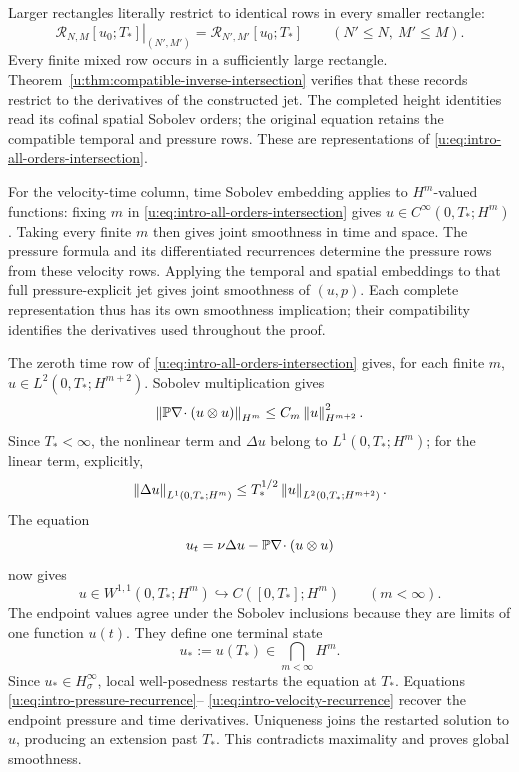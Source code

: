 Larger rectangles literally restrict to identical rows in every smaller
rectangle:
\begin{equation}
 \left.\mathcal R_{N,M}[u_0;T_*]\right|_{(N',M')}
 =\mathcal R_{N',M'}[u_0;T_*]
 \qquad(N'\le N,\ M'\le M).
 \label{u:eq:intro-compatible-intersection}
\end{equation}
Every finite mixed row occurs in a sufficiently large rectangle.
Theorem~\ref{u:thm:compatible-inverse-intersection} verifies that these
records restrict to the derivatives of the constructed jet. The completed
height identities read its cofinal spatial Sobolev orders; the original
equation retains the compatible temporal and pressure rows. These are
representations of \eqref{u:eq:intro-all-orders-intersection}.

For the velocity-time column, time Sobolev embedding applies to
\(H^m\)-valued functions: fixing \(m\) in
\eqref{u:eq:intro-all-orders-intersection} gives
\(u\in C^\infty(0,T_*;H^m)\).  Taking every finite \(m\) then gives
joint smoothness in time and space.  The pressure formula and its
differentiated recurrences determine the pressure rows from these velocity
rows.  Applying the temporal and spatial embeddings to that full
pressure-explicit jet gives joint smoothness of \((u,p)\).
Each complete representation thus has its own smoothness implication;
their compatibility identifies the derivatives used throughout the proof.

The zeroth time row of \eqref{u:eq:intro-all-orders-intersection} gives, for
each finite \(m\), \(u\in L^2(0,T_*;H^{m+2})\).  Sobolev multiplication gives
\[
 \left\lVert \mathbb P\nabla\!\cdot(u\otimes u)\right\rVert_{H^m}
 \le C_m\left\lVert u\right\rVert_{H^{m+2}}^2.
\]
Since \(T_*<\infty\), the nonlinear term and \(\Delta u\) belong to
\(L^1(0,T_*;H^m)\); for the linear term, explicitly,
\[
 \left\lVert \Delta u\right\rVert_{L^1(0,T_*;H^m)}
 \le T_*^{1/2}\left\lVert u\right\rVert_{L^2(0,T_*;H^{m+2})}.
\]
The equation
\[
 u_t=\nu\Delta u-\mathbb P\nabla\!\cdot(u\otimes u)
\]
now gives
\[
 u\in W^{1,1}(0,T_*;H^m)
 \hookrightarrow C([0,T_*];H^m)
 \qquad(m<\infty).
\]
The endpoint values agree under the Sobolev inclusions because they are limits
of one function \(u(t)\).  They define one terminal state
\[
 u_*:=u(T_*)\in\bigcap_{m<\infty}H^m.
\]
Since \(u_*\in H^\infty_\sigma\), local well-posedness restarts the equation
at \(T_*\).  Equations \eqref{u:eq:intro-pressure-recurrence}--%
\eqref{u:eq:intro-velocity-recurrence} recover the endpoint pressure and time
derivatives.  Uniqueness joins the restarted solution to \(u\), producing an
extension past \(T_*\).  This contradicts maximality and proves global
smoothness.

\clearpage
